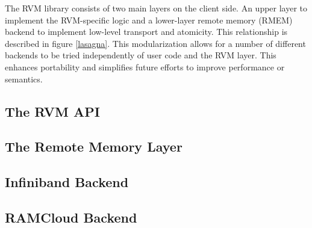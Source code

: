 The RVM library consists of two main layers on the client side. An upper layer
to implement the RVM-specific logic and a lower-layer remote memory (RMEM)
backend to implement low-level transport and atomicity. This relationship is
described in figure \ref{lasagna}. This modularization allows for a number of
different backends to be tried independently of user code and the RVM layer.
This enhances portability and simplifies future efforts to improve performance
or semantics.

\subsection{The RVM API}



\subsection{The Remote Memory Layer}



\subsection{Infiniband Backend}



\subsection{RAMCloud Backend}


